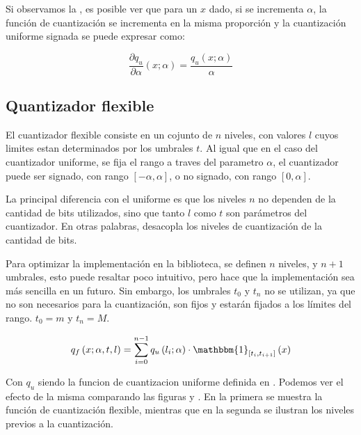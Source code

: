 Si observamos la , es posible ver que para un $x$ dado, si se incrementa $\alpha$, la función de cuantización se incrementa en la misma proporción y la cuantización uniforme signada se puede expresar como:

\begin{equation}
    \label{eq:uniform_quantizer_signed_dq_dalpha}
    \frac{\partial q_u}{\partial \alpha}\left(x; \alpha\right) = \frac{q_u(x; \alpha)}{\alpha}
\end{equation}

\subsection{Quantizador flexible}
\label{sec:flex}

El cuantizador flexible consiste en un cojunto de $n$ niveles, con valores $l$ cuyos limites estan determinados por los umbrales $t$. Al igual que en el caso del cuantizador uniforme, se fija el rango a traves del parametro $\alpha$, el cuantizador puede ser signado, con rango $[-\alpha, \alpha]$, o no signado, con rango $[0, \alpha]$.

La principal diferencia con el uniforme es que los niveles $n$ no dependen de la cantidad de bits utilizados, sino que tanto $l$ como $t$ son parámetros del cuantizador. En otras palabras, desacopla los niveles de cuantización de la cantidad de bits.

Para optimizar la implementación en la biblioteca, se definen $n$ niveles, y $n+1$ umbrales, esto puede resaltar poco intuitivo, pero hace que la implementación sea más sencilla en un futuro. Sin embargo, los umbrales $t_0$ y $t_n$ no se utilizan, ya que no son necesarios para la cuantización, son fijos y estarán fijados a los límites del rango. $t_0 = m$ y $t_n = M$.

\begin{equation}
    \label{eq:flexible_quantizer}
    q_f\left(x; \alpha, t, l\right) = \sum_{i=0}^{n-1} q_u\left({l_i; \alpha}\right) \cdot \mathbbm{1}_{\left[t_i, t_{i+1}\right]}\left(x\right)
\end{equation}

Con $q_u$ siendo la funcion de cuantizacion uniforme definida en . Podemos ver el efecto de la misma comparando las figuras  y . En la primera se muestra la función de cuantización flexible, mientras que en la segunda se ilustran los niveles previos a la cuantización.

